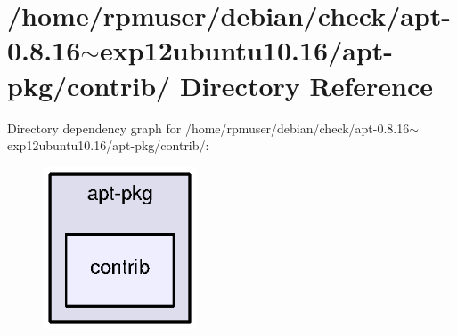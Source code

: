 \section{/home/rpmuser/debian/check/apt-\/0.8.16$\sim$exp12ubuntu10.16/apt-\/pkg/contrib/ \-Directory \-Reference}
\label{dir_87d1b8036432fb23d6feb2df2bd1c72f}
\-Directory dependency graph for /home/rpmuser/debian/check/apt-\/0.8.16$\sim$exp12ubuntu10.16/apt-\/pkg/contrib/\-:
\nopagebreak
\begin{figure}[H]
\begin{center}
\leavevmode
\includegraphics[width=130pt]{dir_87d1b8036432fb23d6feb2df2bd1c72f_dep}
\end{center}
\end{figure}
